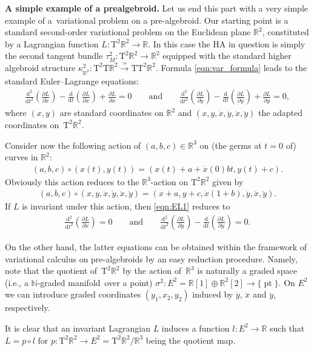 \documentclass[pdftex]{sigma}
\newcommand{\grB}{{$\N$-graded manifold}}
\newcommand{\R}{\mathbb{R}}
\newcommand{\N}{\mathbb{N}}
\newcommand{\pa}{\partial}
\newcommand{\pt}{\operatorname{pt}}
\newcommand{\lra}{\longrightarrow}
\newcommand{\ra}{\rightarrow}
\newcommand{\prealg}{pre-algebroid} %
\newcommand{\T}{\mathrm{T}} %
\newcommand{\TT}[1]{\mathrm{T}^{#1}} %
\newcommand{\dbydt}{\frac{\mathrm{d}}{\mathrm{d}t}}
\newcommand{\dbydtk}[1]{\frac{\mathrm{d}^{#1}}{\mathrm{d}t^{#1}}}
\numberwithin{equation}{section}
\theoremstyle{definition}
\begin{document}
{\bf A simple example of a prealgebroid.} Let us end this part with a very simple example of a~variational problem on a \prealg . Our starting point is a standard second-order variational problem on the Euclidean plane $\R^2$, constituted by a Lagrangian function \mbox{$L\colon \TT{2}\R^2\ra \R$}. In this case the HA in question is simply the second tangent bundle $\tau^2_M\colon \TT{2} \R^2\ra \R^2$ equipped with the standard higher algebroid structure $\kappa^2_{\R^2}\colon \TT{2}\T\R^2\overset{\simeq}{\lra}\T\TT{2}\R^2$. Formula \eqref{eqn:var_formula} leads to the standard Euler--Lagrange equations:
\begin{gather}\label{eqn:EL1}
\dbydtk{2}\left(\frac{\pa L}{\pa \ddot x}\right)-\dbydt \left(\frac{\pa L}{\pa \dot x}\right)+\frac{\pa L}{\pa x}=0\qquad\text{and}\qquad \dbydtk{2}\left(\frac{\pa L}{\pa \ddot y}\right)-\dbydt \left(\frac{\pa L}{\pa \dot y}\right)+\frac{\pa L}{\pa y}=0,
\end{gather}
where $(x,y)$ are standard coordinates on $\R^2$ and $(x,y,\dot x,\dot y,\ddot x,\ddot y)$ the adapted coordinates on~$\TT{2}\R^2$.

Consider now the following action of $(a,b,c)\in \R^3$ on (the germs at $t=0$ of) curves in $\R^2$:
\begin{gather*}(a,b,c)\circ (x(t),y(t))=(x(t)+a+\dot x(0)bt, y(t)+c).\end{gather*}
Obviously this action reduces to the $\R^3$-action on $\TT{2}\R^2$ given by
\begin{gather*}(a,b,c)\circ (x,y,\dot x,\dot y,\ddot x,\ddot y)=(x+a,y+c,\dot x(1+b),\dot y,\ddot x,\ddot y).\end{gather*}
If $L$ is invariant under this action, then \eqref{eqn:EL1} reduces to
\begin{gather}\label{eqn:EL2}
\dbydtk{2}\left(\frac{\pa L}{\pa \ddot x}\right)=0\qquad\text{and}\qquad \dbydtk{2}\left(\frac{\pa L}{\pa \ddot y}\right)-\dbydt \left(\frac{\pa L}{\pa \dot y}\right)=0.
\end{gather}

On the other hand, the latter equations can be obtained within the framework of variational calculus on \prealg s by an easy reduction procedure. Namely, note that the quotient of~$\TT{2}\R^2$ by the action of~$\R^3$ is naturally a graded space (i.e., a \grB\ over a point) $\sigma^2\colon E^2=\R[1]\oplus\R^2[2]\ra\{\pt\}$. On $E^2$ we can introduce graded coordinates $(y_1,x_2,y_2)$ induced by $\dot y$, $\ddot x$ and $\ddot y$, respectively.

It is clear that an invariant Lagrangian $L$ induces a function $l\colon E^2\ra\R$ such that $L=p\circ l$ for $p\colon \TT{2}\R^2\ra E^2=\TT{2}\R^2/\R^3$ being the quotient map.
\end{document}
